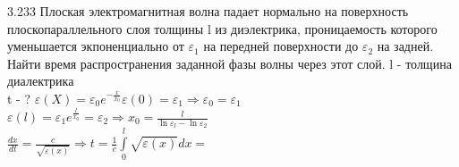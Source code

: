 \testCom
{%
	3.233
}
{%
	Плоская электромагнитная волна падает нормально на поверхность плоскопараллельного слоя толщины l из диэлектрика, проницаемость которого уменьшается экпоненциально от ${\varepsilon}_{1}$ на передней поверхности до ${\varepsilon}_{2}$ на задней. Найти время распространения заданной фазы волны через этот слой.
}
{%
	l - толщина диалектрика\\
	
}
{%
	t - ?
}
{%
	$\varepsilon(X) = {\varepsilon}_{0} e^{-\frac{x}{{x}_{0}}} \varepsilon (0) = {\varepsilon}_{1}\Rightarrow {\varepsilon}_{0}={\varepsilon}_{1}$\\
	$\varepsilon (l) = {\varepsilon}_{1} e^{\frac{l}{{x}_{0}}} = {\varepsilon}_{2} \Rightarrow {x}_{0} = \frac{l}{ \ln {\varepsilon}_{l} - \ln {\varepsilon}_{2}}$\\
	$\frac{dx}{dt} = \frac{c}{\sqrt{\varepsilon (x)}}\Rightarrow t = \frac{1}{c} \int\limits_0^l \sqrt{\varepsilon (x)} dx = $\\
}

